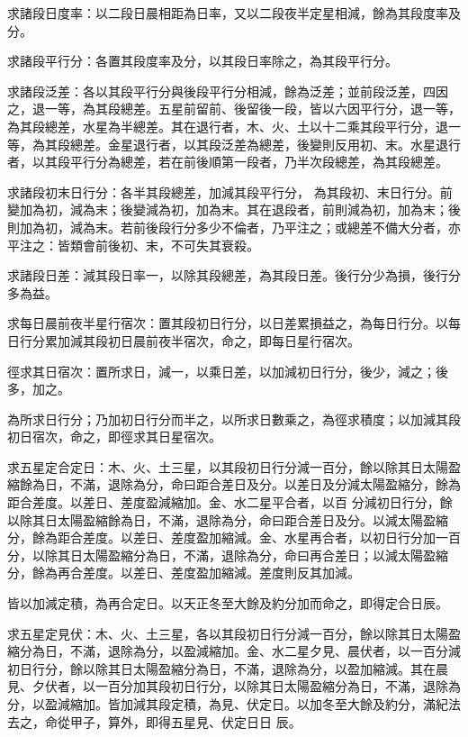 \begin{pinyinscope}
 求諸段日度率：以二段日晨相距為日率，又以二段夜半定星相減，餘為其段度率及分。



 求諸段平行分：各置其段度率及分，以其段日率除之，為其段平行分。



 求諸段泛差：各以其段平行分與後段平行分相減，餘為泛差；並前段泛差，四因之，退一等，為其段總差。五星前留前、後留後一段，皆以六因平行分，退一等，為其段總差，水星為半總差。其在退行者，木、火、土以十二乘其段平行分，退一等，為其段總差。金星退行者，以其段泛差為總差，後變則反用初、末。水星退行者，以其段平行分為總差，若在前後順第一段者，乃半次段總差，為其段總差。



 求諸段初末日行分：各半其段總差，加減其段平行分，
 為其段初、末日行分。前變加為初，減為末；後變減為初，加為末。其在退段者，前則減為初，加為末；後則加為初，減為末。若前後段行分多少不倫者，乃平注之；或總差不備大分者，亦平注之：皆類會前後初、末，不可失其衰殺。



 求諸段日差：減其段日率一，以除其段總差，為其段日差。後行分少為損，後行分多為益。



 求每日晨前夜半星行宿次：置其段初日行分，以日差累損益之，為每日行分。以每日行分累加減其段初日晨前夜半宿次，命之，即每日星行宿次。



 徑求其日宿次：置所求日，減一，以乘日差，以加減初日行分，後少，減之；後多，加之。



 為所求日行分；乃加初日行分而半之，以所求日數乘之，為徑求積度；以加減其段初日宿次，命之，即徑求其日星宿次。



 求五星定合定日：木、火、土三星，以其段初日行分減一百分，餘以除其日太陽盈縮餘為日，不滿，退除為分，命曰距合差日及分。以差日及分減太陽盈縮分，餘為距合差度。以差日、差度盈減縮加。金、水二星平合者，以百
 分減初日行分，餘以除其日太陽盈縮餘為日，不滿，退除為分，命曰距合差日及分。以減太陽盈縮分，餘為距合差度。以差日、差度盈加縮減。金、水星再合者，以初日行分加一百分，以除其日太陽盈縮分為日，不滿，退除為分，命曰再合差日；以減太陽盈縮分，餘為再合差度。以差日、差度盈加縮減。差度則反其加減。



 皆以加減定積，為再合定日。以天正冬至大餘及約分加而命之，即得定合日辰。



 求五星定見伏：木、火、土三星，各以其段初日行分減一百分，餘以除其日太陽盈縮分為日，不滿，退除為分，以盈減縮加。金、水二星夕見、晨伏者，以一百分減初日行分，餘以除其日太陽盈縮分為日，不滿，退除為分，以盈加縮減。其在晨見、夕伏者，以一百分加其段初日行分，以除其日太陽盈縮分為日，不滿，退除為分，以盈減縮加。皆加減其段定積，為見、伏定日。以加冬至大餘及約分，滿紀法去之，命從甲子，算外，即得五星見、伏定日日
 辰。




\end{pinyinscope}
